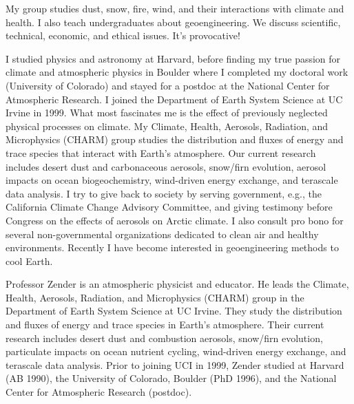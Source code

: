 \documentclass[10pt,twoside]{article}
\begin{document}
{{%
My group studies dust, snow, fire, wind, and their interactions with 
climate and health. I also teach undergraduates about geoengineering.
We discuss scientific, technical, economic, and ethical issues.
It's provocative!

I studied physics and astronomy at Harvard, before finding my true
passion for climate and atmospheric physics in Boulder where I
completed my doctoral work (University of Colorado) and stayed for a 
postdoc at the National Center for Atmospheric Research.
I joined the Department of Earth System Science at UC Irvine in 1999.
What most fascinates me is the effect of previously neglected physical
processes on climate. My Climate, Health, Aerosols, Radiation, and
Microphysics (CHARM) group studies the distribution and fluxes of
energy and trace species that interact with Earth's atmosphere. 
Our current research includes desert dust and carbonaceous aerosols,
snow/firn evolution, aerosol impacts on ocean biogeochemistry,
wind-driven energy exchange, and terascale data analysis. 
I try to give back to society by serving government, e.g., the
California Climate Change Advisory Committee, and giving testimony
before Congress on the effects of aerosols on Arctic climate.  
I also consult pro bono for several non-governmental organizations
dedicated to clean air and healthy environments. Recently I have
become interested in geoengineering methods to cool Earth.

Professor Zender is an atmospheric physicist and educator.  
He leads the Climate, Health, Aerosols, Radiation, and Microphysics
(CHARM) group in the Department of Earth System Science at UC Irvine.
They study the distribution and fluxes of energy and trace species
in Earth's atmosphere.  Their current research includes desert dust
and combustion aerosols, snow/firn evolution, particulate impacts on
ocean nutrient cycling, wind-driven energy exchange, and terascale
data analysis.  Prior to joining UCI in 1999, Zender studied at
Harvard (AB 1990), the University of Colorado, Boulder (PhD 1996), and
the National Center for Atmospheric Research (postdoc).

}}
\end{document}
